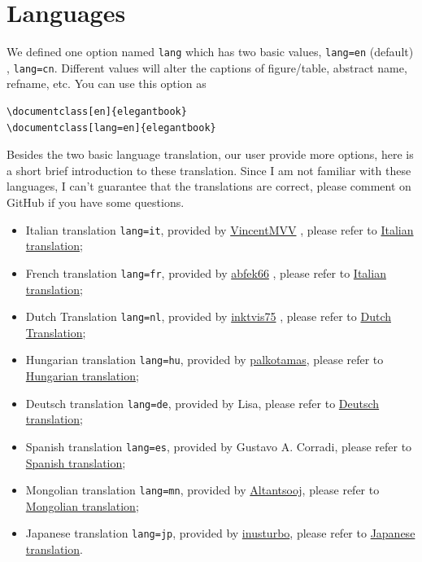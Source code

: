 \documentclass[11pt]{elegantbook}
\begin{document}
\section{Languages}
We defined one option named \lstinline{lang} which has two basic values, \lstinline{lang=en} (default) , \lstinline{lang=cn}. Different values will alter the captions of figure/table, abstract name, refname, etc. You can use this option as

\begin{lstlisting}
\documentclass[en]{elegantbook} 
\documentclass[lang=en]{elegantbook}
\end{lstlisting}

Besides the two basic language translation, our user provide more options, here is a short brief introduction to these translation. Since I am not familiar with these languages, I can't guarantee that the translations are correct, please comment on GitHub if you have some questions.

\begin{itemize}
  \item Italian translation \lstinline{lang=it}, provided by \href{https://github.com/VincentMVV}{VincentMVV} , please refer to \href{https://github.com/ElegantLaTeX/ElegantBook/issues/85}{Italian translation};
  \item French translation \lstinline{lang=fr}, provided by \href{https://github.com/abfek66}{abfek66} , please refer to \href{https://github.com/ElegantLaTeX/ElegantBook/issues/85}{Italian translation};
  \item Dutch Translation \lstinline{lang=nl}, provided by \href{https://github.com/inktvis75}{inktvis75} , please refer to \href{https://github.com/ElegantLaTeX/ElegantBook/issues/108}{Dutch Translation};
  \item Hungarian translation \lstinline{lang=hu}, provided by \href{https://github.com/palkotamas}{palkotamas}, please refer to \href{https://github.com/ElegantLaTeX/ElegantBook/issues/111}{Hungarian translation};
  \item Deutsch translation \lstinline{lang=de}, provided by Lisa, please refer to \href{https://github.com/ElegantLaTeX/ElegantBook/issues/113}{Deutsch translation};
  \item Spanish translation \lstinline{lang=es}, provided by Gustavo A. Corradi, please refer to \href{https://github.com/ElegantLaTeX/ElegantBook/issues/133}{Spanish translation};
  \item Mongolian translation \lstinline{lang=mn}, provided by \href{https://github.com/Altantsooj}{Altantsooj}, please refer to \href{https://github.com/ElegantLaTeX/ElegantBook/issues/137}{Mongolian translation};
  \item Japanese translation \lstinline{lang=jp}, provided by \href{https://github.com/inusturbo}{inusturbo}, please refer to \href{https://github.com/ElegantLaTeX/ElegantBook/issues/172}{Japanese translation}.
\end{itemize}
\end{document}
